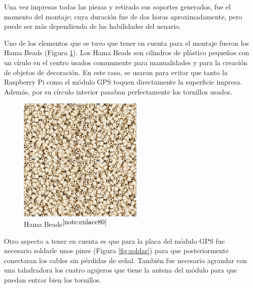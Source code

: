 Una vez impresas todas las piezas y retirado sus soportes generados, fue el momento del montaje; cuya duración fue de dos horas aproximadamente,  pero puede ser más dependiendo de las habilidades del usuario.

Uno de los elementos que se tuvo que tener en cuenta para el montaje fueron los Hama Beads (Figura \ref{fig:hamabeads}). Los Hama Beads son cilindros de plástico pequeños con un círulo en el centro usados comunmente para manualidades y para la creación de objetos de decoración. En este caso, se usaron para evitar que tanto la Raspberry Pi como el módulo GPS toquen directamente la superficie impresa. Además, por su círculo interior pasaban perfectamente los tornillos usados. 

\begin{figure} [h!]
	\begin{center}
		\includegraphics[width=6cm]{figs/cap5/hama.png}
	\end{center}
	\caption{Hama Beads$^{\ref{note:enlace80}}$} 
	\label{fig:hamabeads}
\end{figure}

\setcounter{footnote}{80} %


Otro aspecto a tener en cuenta es que para la placa del módulo GPS fue necesario soldarle unos pines (Figura \ref{fig:soldar}) para que posteriormente conectaran los cables sin pérdidas de señal. También fue necesario agrandar con una taladradora los cuatro agujeros que tiene la antena del módulo para que puedan entrar bien los tornillos. 


